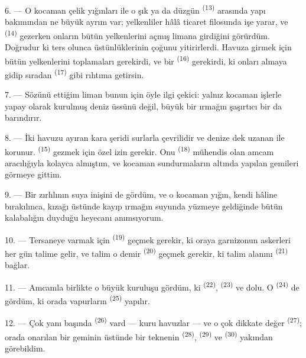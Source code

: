 6. --- O kocaman çelik yığınları ile o şık  ya da düzgün
 \textsuperscript{(13)} arasında yapı bakımından ne büyük
ayrım var; yelkenliler hâlâ ticaret filosunda işe yarar, ve
 \textsuperscript{(14)} gezerken onların bütün yelkenlerini
açmış limana girdiğini görürdüm. Doğrudur ki  ters olunca
üstünlüklerinin çoğunu yitirirlerdi. Havuza girmek için bütün yelkenlerini
toplamaları gerekirdi, ve bir  \textsuperscript{(16)} gerekirdi, ki onları
almaya
gidip sıradan  \textsuperscript{(17)} gibi rıhtıma
getirsin.

\VUsaut{3.0mm}
\VUsaut{3.0mm}

7. --- Sözünü ettiğim liman bunun için öyle ilgi çekici: yalnız kocaman
işlerle yapay olarak kurulmuş deniz üssünü değil, büyük bir ırmağın
 şaşırtıcı bir  da barındırır.

8. --- İki havuzu ayıran kara şeridi surlarla çevrilidir ve denize dek uzanan
 ile  korunur. 
\textsuperscript{(15)} gezmek için özel izin gerekir. Onu
 \textsuperscript{(18)} mühendis olan amcam aracılığıyla
kolayca almıştım, ve kocaman sundurmaların altında yapılan gemileri görmeye
gittim.

9. --- Bir zırhlının suya inişini de gördüm, ve o kocaman yığın, kendi hâline
bırakılınca, kızağı üstünde kayıp ırmağın suyunda yüzmeye geldiğinde bütün
kalabalığın duyduğu heyecanı anımsıyorum.

10. --- Tersaneye varmak için  \textsuperscript{(19)}
geçmek gerekir, ki oraya garnizonun askerleri her gün talime gelir, ve talim
o demir  \textsuperscript{(20)} geçmek gerekir, ki talim
alanını  \textsuperscript{(21)} bağlar.

\VUsaut{3.0mm}
\VUsaut{3.0mm}

11. --- Amcamla birlikte o büyük kuruluşu gördüm, ki 
\textsuperscript{(22)},  \textsuperscript{(23)} ve
 dolu. O  \textsuperscript{(24)} de gördüm, ki orada vapurların
 \textsuperscript{(25)} yapılır.

12. --- Çok yanı başında  \textsuperscript{(26)} vard ---
kuru havuzlar --- ve o çok dikkate değer 
\textsuperscript{(27)}; orada onarılan bir geminin üstünde bir teknenin
 \textsuperscript{(28)}, 
\textsuperscript{(29)} ve  \textsuperscript{(30)} yakından
görebildim.

